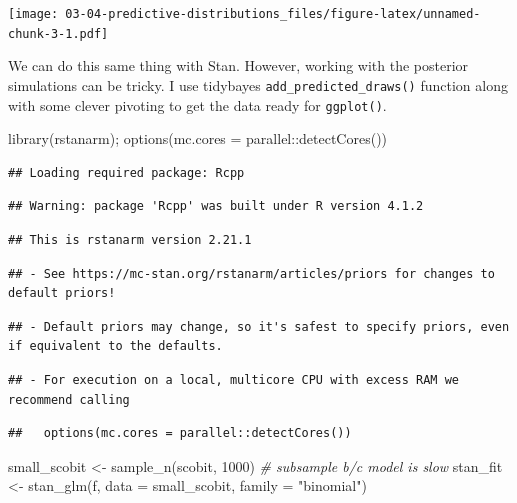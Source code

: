 \documentclass[
]{book}
\newenvironment{Shaded}{\begin{snugshade}}{\end{snugshade}}
\newcommand{\AttributeTok}[1]{\textcolor[rgb]{0.77,0.63,0.00}{#1}}
\newcommand{\CommentTok}[1]{\textcolor[rgb]{0.56,0.35,0.01}{\textit{#1}}}
\newcommand{\DecValTok}[1]{\textcolor[rgb]{0.00,0.00,0.81}{#1}}
\newcommand{\FunctionTok}[1]{\textcolor[rgb]{0.00,0.00,0.00}{#1}}
\newcommand{\NormalTok}[1]{#1}
\newcommand{\OtherTok}[1]{\textcolor[rgb]{0.56,0.35,0.01}{#1}}
\newcommand{\SpecialCharTok}[1]{\textcolor[rgb]{0.00,0.00,0.00}{#1}}
\newcommand{\StringTok}[1]{\textcolor[rgb]{0.31,0.60,0.02}{#1}}
\begin{document}
\texttt{[image: 03-04-predictive-distributions\_files/figure-latex/unnamed-chunk-3-1.pdf]}

We can do this same thing with Stan. However, working with the posterior simulations can be tricky. I use tidybayes \texttt{add\_predicted\_draws()} function along with some clever pivoting to get the data ready for \texttt{ggplot()}.

\begin{Shaded}
\begin{Highlighting}[]
\FunctionTok{library}\NormalTok{(rstanarm); }\FunctionTok{options}\NormalTok{(}\AttributeTok{mc.cores =}\NormalTok{ parallel}\SpecialCharTok{::}\FunctionTok{detectCores}\NormalTok{())}
\end{Highlighting}
\end{Shaded}

\begin{verbatim}
## Loading required package: Rcpp
\end{verbatim}

\begin{verbatim}
## Warning: package 'Rcpp' was built under R version 4.1.2
\end{verbatim}

\begin{verbatim}
## This is rstanarm version 2.21.1
\end{verbatim}

\begin{verbatim}
## - See https://mc-stan.org/rstanarm/articles/priors for changes to default priors!
\end{verbatim}

\begin{verbatim}
## - Default priors may change, so it's safest to specify priors, even if equivalent to the defaults.
\end{verbatim}

\begin{verbatim}
## - For execution on a local, multicore CPU with excess RAM we recommend calling
\end{verbatim}

\begin{verbatim}
##   options(mc.cores = parallel::detectCores())
\end{verbatim}

\begin{Shaded}
\begin{Highlighting}[]
\NormalTok{small\_scobit }\OtherTok{\textless{}{-}} \FunctionTok{sample\_n}\NormalTok{(scobit, }\DecValTok{1000}\NormalTok{)  }\CommentTok{\# subsample b/c model is slow}
\NormalTok{stan\_fit }\OtherTok{\textless{}{-}} \FunctionTok{stan\_glm}\NormalTok{(f, }\AttributeTok{data =}\NormalTok{ small\_scobit, }\AttributeTok{family =} \StringTok{"binomial"}\NormalTok{)}
\end{Highlighting}
\end{Shaded}
\end{document}
